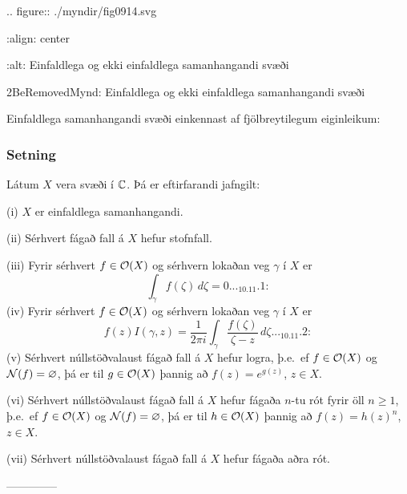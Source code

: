 .. figure:: ./myndir/fig0914.svg

    :align: center

    :alt: Einfaldlega  og ekki
einfaldlega samanhangandi svæði

    2BeRemovedMynd: Einfaldlega  og ekki
einfaldlega samanhangandi svæði


\noindent
Einfaldlega samanhangandi svæði einkennast af fjölbreytilegum eiginleikum:


\subsubsection{Setning}  Látum $X$ vera svæði í ${\mathbb C}$.  Þá er eftirfarandi jafngilt:

\smallskip\noindent
(i)  $X$ er einfaldlega samanhangandi.

\smallskip\noindent
(ii) Sérhvert fágað fall á $X$ hefur stofnfall.

\smallskip\noindent
(iii) Fyrir sérhvert $f\in {\cal O}(X)$ og sérhvern lokaðan veg $\gamma$ í
$X$ er
 \begin{equation*}\int_\gamma f(\zeta) \, d\zeta = 0.


.. _10.11.1:

 \end{equation*}
\smallskip\noindent
(iv) Fyrir sérhvert $f\in {\cal O}(X)$ og sérhvern lokaðan veg $\gamma$ í
$X$ er
 \begin{equation*}f(z)I(\gamma,z) = \dfrac 1{2\pi i}\int_\gamma \dfrac{f(\zeta)}
{\zeta-z} \, d\zeta.


.. _10.11.2:

 \end{equation*}
\smallskip\noindent
(v)  Sérhvert núllstöðvalaust fágað fall á $X$ hefur logra, þ.e.~ef
$f\in {\cal O}(X)$ og ${\cal N}(f)=\varnothing$, þá er til $g\in {\cal O}(X)$ þannig að
$f(z)=e^{g(z)}$, $z\in X$.

\smallskip\noindent
(vi) Sérhvert núllstöðvalaust fágað fall á $X$ hefur fágaða $n$-tu rót
fyrir öll $n\geq 1$, þ.e.~ef
$f\in {\cal O}(X)$ og ${\cal N}(f)=\varnothing$, þá er til $h\in {\cal O}(X)$ þannig að
$f(z)=h(z)^n$, $z\in X$.

\smallskip\noindent
(vii) Sérhvert núllstöðvalaust fágað fall á $X$ hefur fágaða aðra rót.


--------------


 

